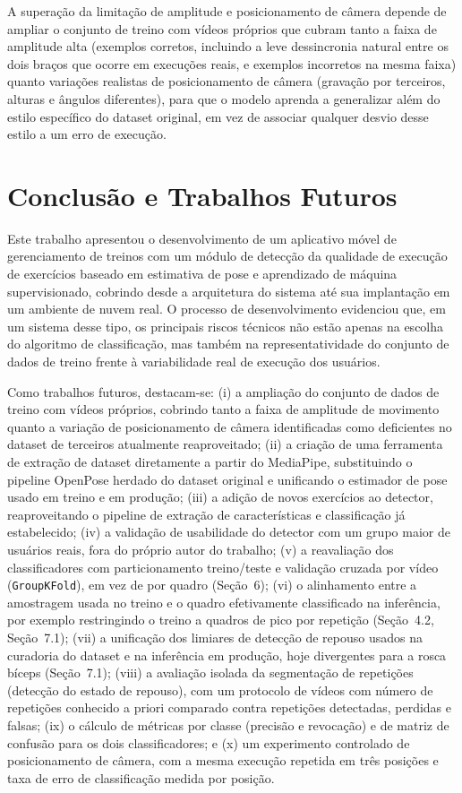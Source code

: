 \documentclass[12pt]{article}
\begin{document}
A superação da limitação de amplitude e posicionamento de câmera depende de ampliar o conjunto de treino com
vídeos próprios que cubram tanto a faixa de amplitude alta (exemplos
corretos, incluindo a leve dessincronia natural entre os dois braços que
ocorre em execuções reais, e exemplos incorretos na mesma faixa) quanto
variações realistas de posicionamento de câmera (gravação por terceiros,
alturas e ângulos diferentes), para que o modelo aprenda a generalizar
além do estilo específico do dataset original, em vez de associar
qualquer desvio desse estilo a um erro de execução.

\section{Conclusão e Trabalhos Futuros}

Este trabalho apresentou o desenvolvimento de um aplicativo móvel de
gerenciamento de treinos com um módulo de detecção da qualidade de
execução de exercícios baseado em estimativa de pose e aprendizado de
máquina supervisionado, cobrindo desde a arquitetura do sistema até sua
implantação em um ambiente de nuvem real. O processo de desenvolvimento
evidenciou que, em um sistema desse tipo, os principais riscos técnicos
não estão apenas na escolha do algoritmo de classificação, mas também na
representatividade do conjunto de dados de treino frente à variabilidade
real de execução dos usuários.

Como trabalhos futuros, destacam-se: (i) a ampliação do conjunto de
dados de treino com vídeos próprios, cobrindo tanto a faixa de amplitude
de movimento quanto a variação de posicionamento de câmera identificadas
como deficientes no dataset de terceiros atualmente reaproveitado; (ii) a
criação de uma
ferramenta de extração de dataset diretamente a partir do MediaPipe,
substituindo o pipeline OpenPose herdado do dataset original e unificando
o estimador de pose usado em treino e em produção; (iii) a adição de novos
exercícios ao detector, reaproveitando o pipeline de extração de
características e classificação já estabelecido; (iv) a validação de
usabilidade do detector com um grupo maior de usuários reais, fora do
próprio autor do trabalho; (v) a reavaliação dos classificadores com
particionamento treino/teste e validação cruzada por vídeo
(\texttt{GroupKFold}), em vez de por quadro (Seção~6); (vi) o alinhamento
entre a amostragem usada no treino e o quadro efetivamente classificado na
inferência, por exemplo restringindo o treino a quadros de pico por
repetição (Seção~4.2, Seção~7.1); (vii) a unificação dos limiares de
detecção de repouso usados na curadoria do dataset e na inferência em
produção, hoje divergentes para a rosca bíceps (Seção~7.1); (viii) a
avaliação isolada da segmentação de repetições (detecção do estado de
repouso), com um protocolo de vídeos com número de repetições conhecido a
priori comparado contra repetições detectadas, perdidas e falsas; (ix) o
cálculo de métricas por classe (precisão e revocação) e de matriz de
confusão para os dois classificadores; e (x) um experimento controlado de
posicionamento de câmera, com a mesma execução repetida em três posições e
taxa de erro de classificação medida por posição.



\end{document}
